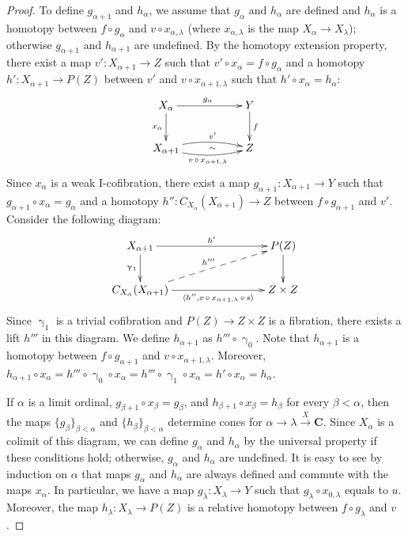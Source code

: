 \documentclass{tac}
\theoremstyle{definition}
\newcommand{\cat}[1]{\mathbf{#1}}
\newcommand{\C}{\cat{C}}
\newcommand{\I}{\mathrm{I}}
\newcommand{\cyli}{\upgamma}
\begin{document}
\begin{proof}
To define $g_{\alpha+1}$ and $h_{\alpha}$, we assume that $g_\alpha$ and $h_\alpha$ are defined and
$h_\alpha$ is a homotopy between $f \circ g_\alpha$ and $v \circ x_{\alpha,\lambda}$ (where $x_{\alpha,\lambda}$ is the map $X_\alpha \to X_\lambda$);
otherwise $g_{\alpha+1}$ and $h_{\alpha+1}$ are undefined.
By the homotopy extension property, there exist a map $v' : X_{\alpha+1} \to Z$ such that $v' \circ x_\alpha = f \circ g_\alpha$
and a homotopy $h' : X_{\alpha+1} \to P(Z)$ between $v'$ and $v \circ x_{\alpha+1,\lambda}$ such that $h' \circ x_\alpha = h_\alpha$:
\[ \xymatrix{ X_\alpha \ar[rr]^{g_\alpha} \ar[d]_{x_\alpha}                                                & & Y \ar[d]^f \\
              X_{\alpha+1} \ar@/^/[rr]^-{v'} \ar@/_/[rr]_{v\,\circ\,x_{\alpha+1,\lambda}} \ar@{}[rr]|-{\sim} & & Z
            } \]
Since $x_\alpha$ is a weak $\I$-cofibration, there exist a map $g_{\alpha+1} : X_{\alpha+1} \to Y$ such that $g_{\alpha+1} \circ x_\alpha = g_\alpha$
and a homotopy $h'' : C_{X_\alpha}(X_{\alpha+1}) \to Z$ between $f \circ g_{\alpha+1}$ and $v'$.
Consider the following diagram:
\[ \xymatrix{ X_{\alpha+1} \ar[rrr]^{h'} \ar[d]_{\cyli_1}                                                                                 & & & P(Z) \ar[d] \\
              C_{X_\alpha}(X_{\alpha+1}) \ar[rrr]_-{\langle h'', v\,\circ\,x_{\alpha+1,\lambda}\,\circ\,s \rangle} \ar@{-->}[rrru]^{h'''} & & & Z \times Z
            } \]
Since $\cyli_1$ is a trivial cofibration and $P(Z) \to Z \times Z$ is a fibration, there exists a lift $h'''$ in this diagram.
We define $h_{\alpha+1}$ as $h''' \circ \cyli_0$.
Note that $h_{\alpha+1}$ is a homotopy between $f \circ g_{\alpha+1}$ and $v \circ x_{\alpha+1,\lambda}$.
Moreover, $h_{\alpha+1} \circ x_\alpha = h''' \circ \cyli_0 \circ x_\alpha = h''' \circ \cyli_1 \circ x_\alpha = h' \circ x_\alpha = h_\alpha$.

If $\alpha$ is a limit ordinal, $g_{\beta+1} \circ x_\beta = g_\beta$, and $h_{\beta+1} \circ x_\beta = h_\beta$ for every $\beta < \alpha$,
then the maps $\{ g_\beta \}_{\beta < \alpha}$ and $\{ h_\beta \}_{\beta < \alpha}$ determine cones for $\alpha \to \lambda \xrightarrow{X} \C$.
Since $X_\alpha$ is a colimit of this diagram, we can define $g_\alpha$ and $h_\alpha$ by the universal property if these conditions hold;
otherwise, $g_\alpha$ and $h_\alpha$ are undefined.
It is easy to see by induction on $\alpha$ that maps $g_\alpha$ and $h_\alpha$ are always defined and commute with the maps $x_\alpha$.
In particular, we have a map $g_\lambda : X_\lambda \to Y$ such that $g_\lambda \circ x_{0,\lambda}$ equals to $u$.
Moreover, the map $h_\lambda : X_\lambda \to P(Z)$ is a relative homotopy between $f \circ g_\lambda$ and $v$.


\end{proof}
\end{document}
